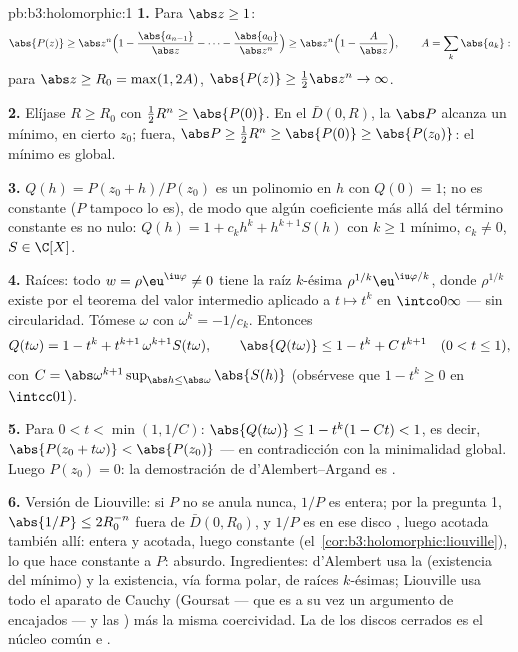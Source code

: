 \begin{solution}{pb:b3:holomorphic:1}
\textbf{1.} Para $\abs z \geq 1$:
\[
\abs{P(z)} \geq \abs z^n\Bigl(1 -
\frac{\abs{a_{n-1}}}{\abs z} - \dots -
\frac{\abs{a_0}}{\abs z^n}\Bigr)
\geq \abs z^n\Bigl(1 - \frac{A}{\abs z}\Bigr),
\qquad A = \sum_k\abs{a_k} :
\]
para $\abs z \geq R_0 = \max(1, 2A)$, $\abs{P(z)} \geq
\frac12\abs z^n \to \infty$.

\textbf{2.} Elíjase $R \geq R_0$ con $\frac12R^n \geq
\abs{P(0)}$. En el 
$\bar D(0, R)$, la 
$\abs P$ alcanza un mínimo, en cierto $z_0$; fuera, $\abs P
\geq \frac12R^n \geq \abs{P(0)} \geq \abs{P(z_0)}$: el mínimo es global.

\textbf{3.} $Q(h) = P(z_0 + h)/P(z_0)$ es un polinomio en $h$ con
$Q(0) = 1$; no es constante ($P$ tampoco lo es), de modo que algún
coeficiente más allá del término constante es no nulo: $Q(h) = 1 +
c_kh^k + h^{k+1}S(h)$ con $k \geq 1$ mínimo, $c_k \neq 0$,
$S \in \C[X]$.

\textbf{4.} Raíces: todo $w = \rho\eu^{\iu\varphi} \neq 0$ tiene la raíz
$k$-ésima $\rho^{1/k}\eu^{\iu\varphi/k}$, donde $\rho^{1/k}$ existe por
el teorema del valor intermedio aplicado a $t \mapsto t^k$ en
$\intco0\infty$ --- sin circularidad. Tómese $\omega$ con
$\omega^k = -1/c_k$. Entonces
\[
Q(t\omega) = 1 - t^k + t^{k+1}\,\omega^{k+1}S(t\omega),
\qquad
\abs{Q(t\omega)} \leq 1 - t^k + C\,t^{k+1}
\quad (0 < t \leq 1),
\]
con $C = \abs\omega^{k+1}\sup_{\abs h \leq
\abs\omega}\abs{S(h)}$ (obsérvese que $1 - t^k \geq 0$ en $\intcc01$).

\textbf{5.} Para $0 < t < \min(1, 1/C)$: $\abs{Q(t\omega)}
\leq 1 - t^k(1 - Ct) < 1$, es decir, $\abs{P(z_0 + t\omega)} <
\abs{P(z_0)}$ --- en contradicción con la minimalidad global. Luego
$P(z_0) = 0$: la demostración de d'Alembert--Argand es
.

\textbf{6.} Versión de Liouville: si $P$ no se anula nunca, $1/P$ es
entera; por la pregunta 1, $\abs{1/P} \leq 2R_0^{-n}$ fuera de
$\bar D(0, R_0)$, y $1/P$ es
 en ese disco
, luego acotada también allí:
entera y acotada, luego constante
(el~\cref{cor:b3:holomorphic:liouville}), lo que hace constante a $P$:
absurdo. Ingredientes: d'Alembert usa la  (existencia del
mínimo) y la existencia, vía forma polar, de raíces $k$-ésimas;
Liouville usa todo el aparato de Cauchy (Goursat --- que es a su vez un
argumento de  encajados --- y
las ) más la
misma coercividad. La  de los discos cerrados es el núcleo
común e .


\end{solution}
